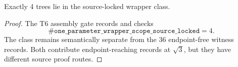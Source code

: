 \begin{proposition}
Exactly 4 trees lie in the source-locked wrapper class.
\end{proposition}

\begin{proof}
The T6 assembly gate records and checks
\[
  \#\texttt{one\_parameter\_wrapper\_scope\_source\_locked}=4.
\]
The class remains semantically separate from the 36 endpoint-free witness records.  Both contribute endpoint-reaching records at \(\sqrt{3}\), but they have different source proof routes.
\end{proof}
